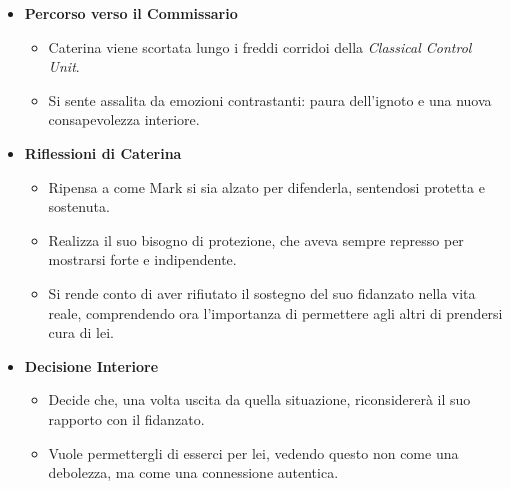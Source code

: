 \begin{itemize}
    \item \textbf{Percorso verso il Commissario}
    \begin{itemize}
        \item Caterina viene scortata lungo i freddi corridoi della \emph{Classical Control Unit}.
        \item Si sente assalita da emozioni contrastanti: paura dell'ignoto e una nuova consapevolezza interiore.
    \end{itemize}
    \item \textbf{Riflessioni di Caterina}
    \begin{itemize}
        \item Ripensa a come Mark si sia alzato per difenderla, sentendosi protetta e sostenuta.
        \item Realizza il suo bisogno di protezione, che aveva sempre represso per mostrarsi forte e indipendente.
        \item Si rende conto di aver rifiutato il sostegno del suo fidanzato nella vita reale, comprendendo ora l'importanza di permettere agli altri di prendersi cura di lei.
    \end{itemize}
    \item \textbf{Decisione Interiore}
    \begin{itemize}
        \item Decide che, una volta uscita da quella situazione, riconsidererà il suo rapporto con il fidanzato.
        \item Vuole permettergli di esserci per lei, vedendo questo non come una debolezza, ma come una connessione autentica.
    \end{itemize}
\end{itemize}

